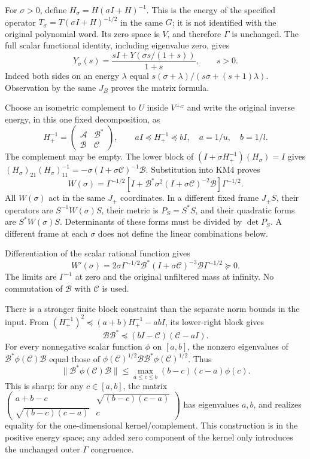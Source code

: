 \documentclass[11pt]{article}
\begin{document}
For \(\sigma>0\), define \(H_\sigma=H(\sigma I+H)^{-1}\). This is the energy of the specified operator \(T_\sigma=T(\sigma I+H)^{-1/2}\) in the same \(G\); it is not identified with the original polynomial word. Its zero space is \(V\), and therefore \(\Gamma\) is unchanged. The full scalar functional identity, including eigenvalue zero, gives \[
 Y_\sigma(s)=\frac{sI+Y(\sigma s/(1+s))}{1+s},\qquad s>0.
 \tag{KM7}
\] Indeed both sides on an energy \(\lambda\) equal \(s(\sigma+\lambda)/(s\sigma+(s+1)\lambda)\). Observation by the same \(J_B\) proves the matrix formula.

Choose an isometric complement to \(U\) inside \(V^{\perp_G}\) and write the original inverse energy, in this one fixed decomposition, as \[
 H_+^{-1}=
 \begin{pmatrix}\mathcal A&\mathcal B^*\\
 \mathcal B&\mathcal C\end{pmatrix},\qquad
 aI\preceq H_+^{-1}\preceq bI,\quad a=1/u,\quad b=1/l.
\] The complement may be empty. The lower block of \((I+\sigma H_+^{-1})(H_\sigma)=I\) gives \((H_\sigma)_{21}(H_\sigma)_{11}^{-1}
=-\sigma(I+\sigma\mathcal C)^{-1}\mathcal B\). Substitution into KM4 proves \[
 W(\sigma)=\Gamma^{-1/2}
 [I+\mathcal B^*\sigma^2(I+\sigma\mathcal C)^{-2}\mathcal B]
 \Gamma^{-1/2}.
 \tag{KM8}
\] All \(W(\sigma)\) act in the same \(J_+\) coordinates. In a different fixed frame \(J_+S\), their operators are \(S^{-1}W(\sigma)S\), their metric is \(P_S=S^*S\), and their quadratic forms are \(S^*W(\sigma)S\). Determinants of these forms must be divided by \(\det P_S\). A different frame at each \(\sigma\) does not define the linear combinations below.

Differentiation of the scalar rational function gives \[
 W'(\sigma)=2\sigma\Gamma^{-1/2}
 \mathcal B^*(I+\sigma\mathcal C)^{-3}\mathcal B\Gamma^{-1/2}\succeq0.
 \tag{KM9}
\] The limits are \(\Gamma^{-1}\) at zero and the original unfiltered mass at infinity. No commutation of \(\mathcal B\) with \(\mathcal C\) is used.

There is a stronger finite block constraint than the separate norm bounds in the input. From \((H_+^{-1})^2\preceq(a+b)H_+^{-1}-abI\), its lower-right block gives \[
 \mathcal B\mathcal B^*\preceq(bI-\mathcal C)(\mathcal C-aI).
 \tag{KM10}
\] For every nonnegative scalar function \(\phi\) on \([a,b]\), the nonzero eigenvalues of \(\mathcal B^*\phi(\mathcal C)\mathcal B\) equal those of \(\phi(\mathcal C)^{1/2}\mathcal B\mathcal B^*\phi(\mathcal C)^{1/2}\). Thus \[
 \|\mathcal B^*\phi(\mathcal C)\mathcal B\|
 \le\max_{a\le c\le b}(b-c)(c-a)\phi(c).
 \tag{KM11}
\] This is sharp: for any \(c\in[a,b]\), the matrix \(\left(\begin{smallmatrix}a+b-c&\sqrt{(b-c)(c-a)}\\
\sqrt{(b-c)(c-a)}&c\end{smallmatrix}\right)\) has eigenvalues \(a,b\), and realizes equality for the one-dimensional kernel/complement. This construction is in the positive energy space; any added zero component of the kernel only introduces the unchanged outer \(\Gamma\) congruence.
\end{document}
